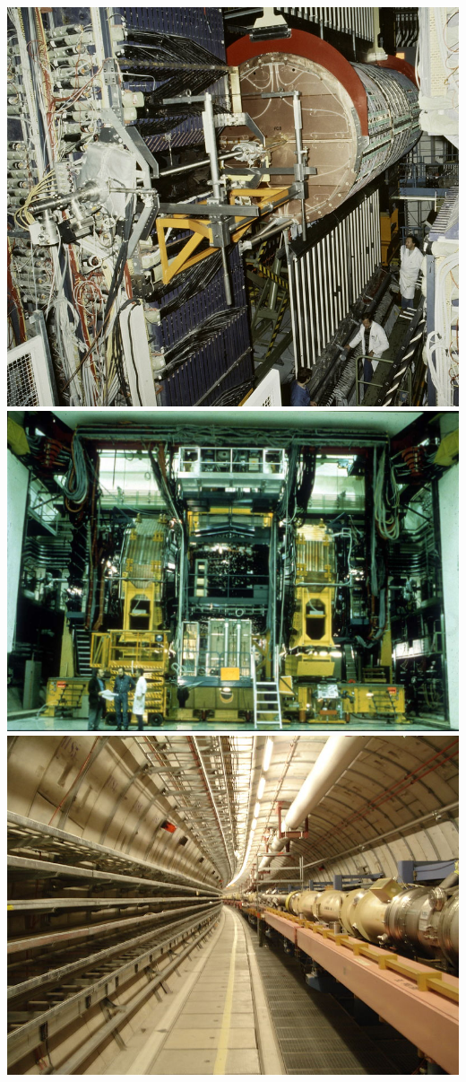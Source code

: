 \marginpar
{
	\centering
	\includegraphics[width=\marginparwidth]{SM/ua1.jpg}
	\label{UA1}
}
\marginpar
{
	\centering
	\includegraphics[width=\marginparwidth]{SM/ua2.jpg}
	\label{UA2}
}
\marginpar
{
	\centering
	\includegraphics[width=\marginparwidth]{SM/HERA.jpg}
	\label{HERA}
}
